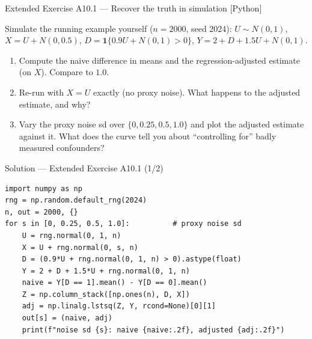 \documentclass[aspectratio=169,11pt]{beamer}
\begin{document}
\begin{frame}{Extended Exercise A10.1 --- Recover the truth in simulation [Python]}
  \begin{longexercise}
    Simulate the running example yourself ($n = 2000$, seed 2024):
    $U \sim N(0,1)$, $X = U + N(0, 0.5)$, $D = \mathbf{1}\{0.9U + N(0,1) > 0\}$,
    $Y = 2 + D + 1.5U + N(0,1)$.
    \begin{enumerate}
      \item Compute the naive difference in means and the regression-adjusted
            estimate (on $X$). Compare to $1.0$.
      \item Re-run with $X = U$ exactly (no proxy noise). What happens to the
            adjusted estimate, and why?
      \item Vary the proxy noise sd over $\{0, 0.25, 0.5, 1.0\}$ and plot the
            adjusted estimate against it. What does the curve tell you about
            ``controlling for'' badly measured confounders?
    \end{enumerate}
  \end{longexercise}
\end{frame}

\begin{frame}[fragile]{Solution --- Extended Exercise A10.1 (1/2)}
  \begin{solutionbox}
\begin{lstlisting}
import numpy as np
rng = np.random.default_rng(2024)
n, out = 2000, {}
for s in [0, 0.25, 0.5, 1.0]:          # proxy noise sd
    U = rng.normal(0, 1, n)
    X = U + rng.normal(0, s, n)
    D = (0.9*U + rng.normal(0, 1, n) > 0).astype(float)
    Y = 2 + D + 1.5*U + rng.normal(0, 1, n)
    naive = Y[D == 1].mean() - Y[D == 0].mean()
    Z = np.column_stack([np.ones(n), D, X])
    adj = np.linalg.lstsq(Z, Y, rcond=None)[0][1]
    out[s] = (naive, adj)
    print(f"noise sd {s}: naive {naive:.2f}, adjusted {adj:.2f}")
\end{lstlisting}
  \end{solutionbox}
\end{frame}
\end{document}
